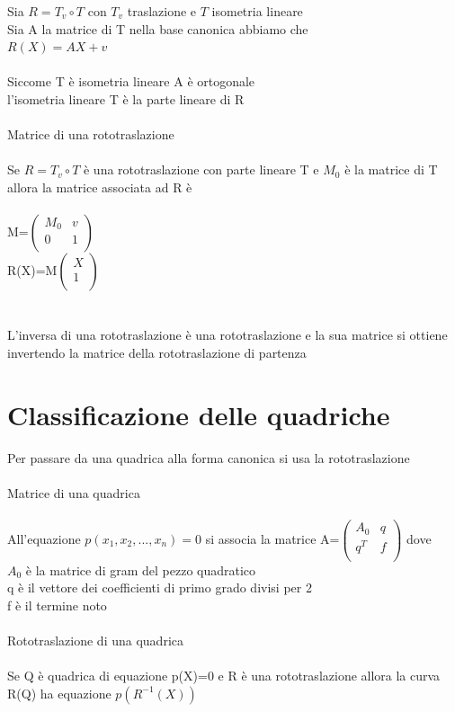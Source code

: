\documentclass{article}
\begin{document}
Sia \(R=T_v \circ T\) con \(T_v\) traslazione e \(T\) isometria lineare\\
Sia A la matrice di T nella base canonica abbiamo che\\
\(R(X)= AX+v\)\\\\
Siccome T è isometria lineare A è ortogonale\\
l'isometria lineare T è la parte lineare di R\\\\
{\large Matrice di una rototraslazione}\\\\
Se \(R=T_v \circ T\) è una rototraslazione con parte lineare T e \(M_0\) è la matrice di T allora la matrice associata ad R è \\\\
M=\(\left( \begin{array}{cc}
	M_0 & v \\
	0 & 1 \\
\end{array}\right) \)\\
R(X)=M\(\left( \begin{array}{c}
	X\\
	1\\
\end{array}\right) \)\\\\\\
L'inversa di una rototraslazione è una rototraslazione e la sua matrice si ottiene invertendo la matrice della rototraslazione di partenza\\
\section{Classificazione delle quadriche}
Per passare da una quadrica alla forma canonica si usa la rototraslazione\\\\
Matrice di una quadrica\\\\
All'equazione \(p(x_1,x_2,...,x_n)=0\) si associa la matrice A=\(\left( 
\begin{array}{cc}
	A_0&q\\
	q^T&f\\
\end{array}
\right) \) dove\\
\(A_0\) è la matrice di gram del pezzo quadratico\\
q è il vettore dei coefficienti di primo grado divisi per 2\\
f è il termine noto\\\\
{\large Rototraslazione di una quadrica}\\\\
Se Q è quadrica di equazione p(X)=0 e R è una rototraslazione allora la curva R(Q) ha equazione \(p(R^{-1}(X))\)\\\\
\end{document}
